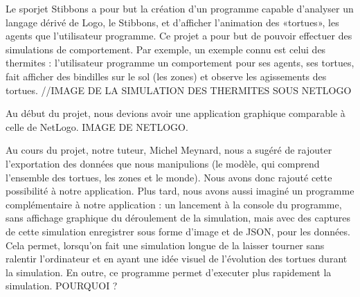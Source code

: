 Le sporjet Stibbons a pour but la création d'un programme capable d'analyser un langage dérivé de Logo, le Stibbons, et d'afficher l'animation des «tortues», les agents que l'utilisateur programme. Ce projet a pour but de pouvoir effectuer des simulations de comportement. Par exemple, un exemple connu est celui des thermites : l'utilisateur programme un comportement pour ses agents, ses tortues, fait afficher des bindilles sur le sol (les zones) et observe les agissements des tortues.
//IMAGE DE LA SIMULATION DES THERMITES SOUS NETLOGO

 Au début du projet, nous devions avoir une application graphique comparable à celle de NetLogo.
IMAGE DE NETLOGO.


Au cours du projet, notre tuteur, Michel Meynard, nous a sugéré de rajouter l'exportation des données que nous manipulions (le modèle, qui comprend l'ensemble des tortues, les zones et le monde). Nous avons donc rajouté cette possibilité à notre application.
Plus tard, nous avons aussi imaginé un programme complémentaire à notre application : un lancement à la console du programme, sans affichage graphique du déroulement de la simulation, mais avec des captures de cette simulation enregistrer sous forme d'image et de JSON, pour les données.
Cela permet, lorsqu'on fait une simulation longue de la laisser tourner sans ralentir l'ordinateur et en ayant une idée visuel de l'évolution des tortues durant la simulation. En outre, ce programme permet d'executer plus rapidement la simulation. POURQUOI ?

